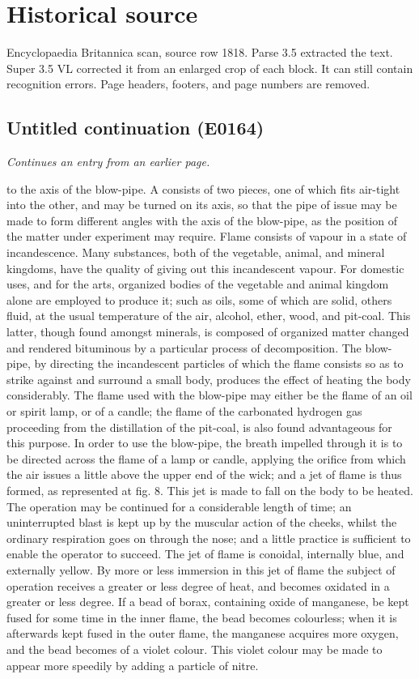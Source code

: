 \documentclass{article}
\begin{document}
\section*{Historical source}
Encyclopaedia Britannica scan, source row 1818. Parse 3.5 extracted the text. Super 3.5 VL corrected it from an enlarged crop of each block. It can still contain recognition errors.
Page headers, footers, and page numbers are removed.

\subsection*{Untitled continuation (E0164)}
\textit{Continues an entry from an earlier page.}

to the axis of the blow-pipe. A consists of two pieces, one of which fits air-tight into the other, and may be turned on its axis, so that the pipe of issue may be made to form different angles with the axis of the blow-pipe, as the position of the matter under experiment may require. Flame consists of vapour in a state of incandescence. Many substances, both of the vegetable, animal, and mineral kingdoms, have the quality of giving out this incandescent vapour. For domestic uses, and for the arts, organized bodies of the vegetable and animal kingdom alone are employed to produce it; such as oils, some of which are solid, others fluid, at the usual temperature of the air, alcohol, ether, wood, and pit-coal. This latter, though found amongst minerals, is composed of organized matter changed and rendered bituminous by a particular process of decomposition. The blow-pipe, by directing the incandescent particles of which the flame consists so as to strike against and surround a small body, produces the effect of heating the body considerably. The flame used with the blow-pipe may either be the flame of an oil or spirit lamp, or of a candle; the flame of the carbonated hydrogen gas proceeding from the distillation of the pit-coal, is also found advantageous for this purpose. In order to use the blow-pipe, the breath impelled through it is to be directed across the flame of a lamp or candle, applying the orifice from which the air issues a little above the upper end of the wick; and a jet of flame is thus formed, as represented at fig. 8. This jet is made to fall on the body to be heated. The operation may be continued for a considerable length of time; an uninterrupted blast is kept up by the muscular action of the cheeks, whilst the ordinary respiration goes on through the nose; and a little practice is sufficient to enable the operator to succeed. The jet of flame is conoidal, internally blue, and externally yellow. By more or less immersion in this jet of flame the subject of operation receives a greater or less degree of heat, and becomes oxidated in a greater or less degree. If a bead of borax, containing oxide of manganese, be kept fused for some time in the inner flame, the bead becomes colourless; when it is afterwards kept fused in the outer flame, the manganese acquires more oxygen, and the bead becomes of a violet colour. This violet colour may be made to appear more speedily by adding a particle of nitre.
\end{document}
